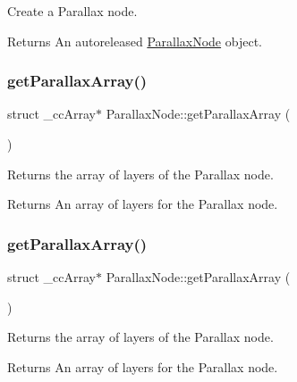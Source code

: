 Create a Parallax node.

\begin{DoxyReturn}{Returns}
An autoreleased \hyperlink{classParallaxNode}{Parallax\+Node} object. 
\end{DoxyReturn}
\mbox{\label{classParallaxNode_a38cffa76b86e590c2ed9e3b307ea5ee1}} 
\subsubsection{\texorpdfstring{get\+Parallax\+Array()}{getParallaxArray()}\hspace{0.1cm}{\footnotesize\ttfamily [1/2]}}
{\footnotesize\ttfamily struct \+\_\+cc\+Array$\ast$ Parallax\+Node\+::get\+Parallax\+Array (\begin{DoxyParamCaption}{ }\end{DoxyParamCaption})\hspace{0.3cm}{\ttfamily [inline]}}

Returns the array of layers of the Parallax node.

\begin{DoxyReturn}{Returns}
An array of layers for the Parallax node. 
\end{DoxyReturn}
\mbox{\label{classParallaxNode_a38cffa76b86e590c2ed9e3b307ea5ee1}} 
\subsubsection{\texorpdfstring{get\+Parallax\+Array()}{getParallaxArray()}\hspace{0.1cm}{\footnotesize\ttfamily [2/2]}}
{\footnotesize\ttfamily struct \+\_\+cc\+Array$\ast$ Parallax\+Node\+::get\+Parallax\+Array (\begin{DoxyParamCaption}{ }\end{DoxyParamCaption})\hspace{0.3cm}{\ttfamily [inline]}}

Returns the array of layers of the Parallax node.

\begin{DoxyReturn}{Returns}
An array of layers for the Parallax node. 
\end{DoxyReturn}
\mbox{\label{classParallaxNode_aa3b4fa198c648421759a8500d2e8d97a}} 
